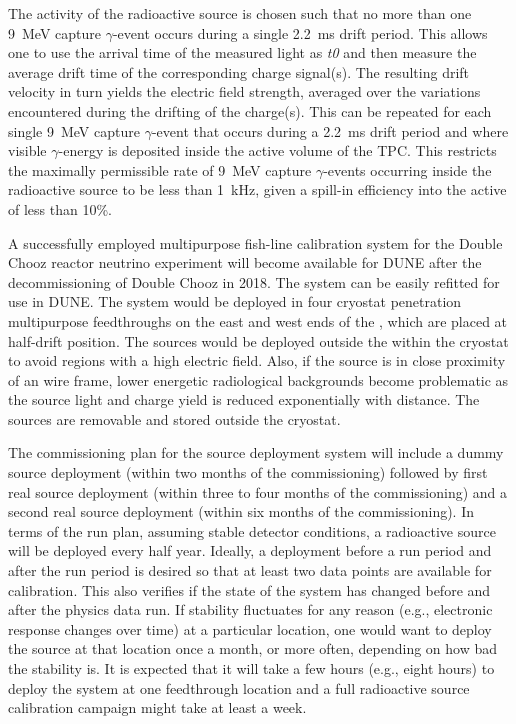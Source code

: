 The activity of the radioactive source is chosen such that no more than one \SI{9}{\MeV} capture $\gamma$-event occurs during a single \SI{2.2}{\milli\s} drift period. This allows one to use the arrival time of the measured light as {\it t0} and then measure the average drift time of the corresponding charge signal(s). The resulting drift velocity in turn yields the electric field strength, averaged over the variations encountered during the drifting of the charge(s). This can be repeated for each single \SI{9}{\MeV} capture $\gamma$-event that occurs during a \SI{2.2}{\milli\s} drift period and where visible $\gamma$-energy is deposited inside the active volume of the TPC. This restricts the maximally permissible rate of \SI{9}{\MeV} capture $\gamma$-events occurring inside the radioactive source to be less
than \SI{1}{\kilo\hertz}, given a spill-in efficiency into the active  of
less than \num{10}\%.

A successfully employed multipurpose fish-line calibration system  for the Double Chooz reactor neutrino experiment will become available for DUNE after the decommissioning of Double Chooz in 2018. The system can be easily refitted for use in DUNE. The system would be deployed in four cryostat penetration multipurpose feedthroughs on the east and west ends of the , which  are placed at half-drift position. The sources would be deployed outside the  within the cryostat to avoid regions with a high electric field. Also, if the source is in close proximity of an  wire frame, lower energetic radiological backgrounds become problematic as the source light and charge yield is reduced exponentially with distance. The sources are removable and stored outside the cryostat.

The commissioning plan for the source deployment system will include a dummy 
source deployment (within two months of the commissioning) followed by first real source deployment (within three to four months of the commissioning) and a second real source deployment (within six months of the commissioning). In terms of the run plan, assuming stable detector conditions, a radioactive source will be deployed every half year. Ideally, a deployment before a run period and after the run period is desired so that at least two data points are available for calibration. This also verifies  if the state of the system has changed before and after the physics data run. If stability fluctuates for any reason (e.g., electronic response changes over time) at a particular location, one would want to deploy the source at that location once a month, or more often, depending on how bad the stability is. It is expected that it will take a few hours (e.g., eight hours) to deploy the system at one feedthrough location and a full radioactive source calibration campaign might take at least a week.

